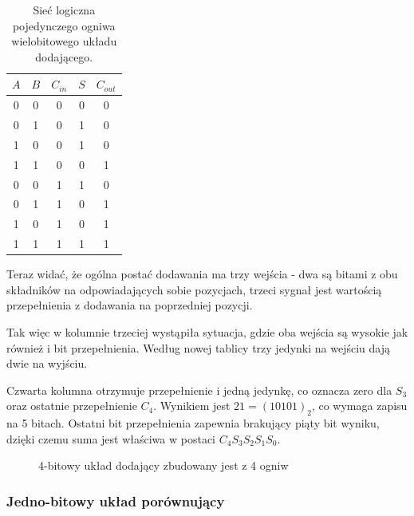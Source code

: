 \documentclass[a4paper,12pt]{article}
\begin{document}
\begin{table}[h!]
\centering

\begin{minipage}{5.5cm}
\centering

\begin{tabular}{ | c | c | c || c | c | }
  \hline
  $A$ & $B$ & $C_{in}$ & $S$ & $C_{out}$ \\ \hline
  0 & 0 & 0 & 0 & 0 \\
  0 & 1 & 0 & 1 & 0 \\
  1 & 0 & 0 & 1 & 0 \\
  1 & 1 & 0 & 0 & 1 \\
  0 & 0 & 1 & 1 & 0 \\
  0 & 1 & 1 & 0 & 1 \\
  1 & 0 & 1 & 0 & 1 \\
  1 & 1 & 1 & 1 & 1 \\
  \hline
\end{tabular}
\end{minipage}
\begin{minipage}{11cm}
   \centering
   
   \caption*{Sieć logiczna pojedynczego ogniwa wielobitowego układu dodającego.}
\end{minipage}
\end{table}

Teraz widać, że ogólna postać dodawania ma trzy wejścia - dwa są bitami z obu składników na odpowiadających sobie pozycjach, trzeci sygnał jest wartością przepełnienia z dodawania na poprzedniej pozycji.

Tak więc w kolumnie trzeciej wystąpiła sytuacja, gdzie oba wejścia są wysokie jak również i bit przepełnienia. Według nowej tablicy trzy jedynki na wejściu dają dwie na wyjściu.

Czwarta kolumna otrzymuje przepełnienie i jedną jedynkę, co oznacza zero dla $S_3$ oraz ostatnie przepełnienie $C_4$. Wynikiem jest $21 = (10101)_2$, co wymaga zapisu na 5 bitach. Ostatni bit przepełnienia zapewnia brakujący piąty bit wyniku, dzięki czemu suma jest właściwa w postaci $C_4 S_3 S_2 S_1 S_0$.

\begin{figure}[htb]
   \centering
   
   \caption*{4-bitowy układ dodający zbudowany jest z 4 ogniw}
\end{figure}


\subsubsection{Jedno-bitowy układ porównujący}
\end{document}
